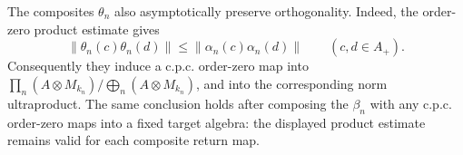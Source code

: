 \begin{remark}
 \label{model:composite-order-zero}
The composites $\theta_n$ also asymptotically preserve
orthogonality.  Indeed, the order-zero product estimate gives
\[
 \|\theta_n(c)\theta_n(d)\|
 \leq\|\alpha_n(c)\alpha_n(d)\|
 \qquad(c,d\in A_+).
\]
Consequently they induce a c.p.c. order-zero map into
$\prod_n(A\otimes M_{k_n})/\bigoplus_n(A\otimes M_{k_n})$,
and into the corresponding norm ultraproduct.  The same conclusion
holds after composing the $\beta_n$ with any c.p.c. order-zero maps
into a fixed target algebra: the displayed product estimate remains
valid for each composite return map.
\end{remark}
